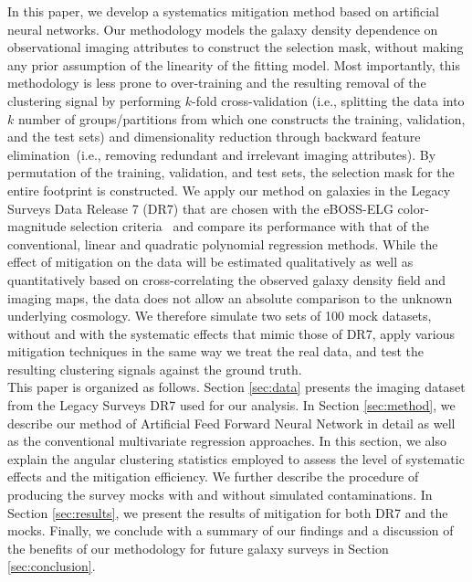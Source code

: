 In this paper, we develop a systematics mitigation method based on artificial neural networks. Our methodology models the galaxy density dependence on observational imaging attributes to construct the selection mask, without making any prior assumption of the linearity of the fitting model. Most importantly, this methodology is less prone to over-training and the resulting removal of the clustering signal by performing $k$-fold cross-validation (i.e., splitting the data into $k$ number of groups/partitions from which one constructs the training, validation, and the test sets) and dimensionality reduction through backward feature elimination~(i.e., removing redundant and irrelevant imaging attributes)\citep[see e.g.,][]{devijver1982pattern, john1994irrelevant, koller1996toward, kohavi1997wrappers, ramaswamy2001multiclass, guyon2003introduction}.  By permutation of the training, validation, and test sets, the selection mask for the entire footprint is constructed.  We apply our method on galaxies in the Legacy Surveys Data Release 7 (DR7) \citep{dey2018overview} that are chosen with the eBOSS-ELG color-magnitude selection criteria~\citep{Raichoor2017MNRAS.471.3955R} and compare its performance with that of the conventional, linear and quadratic polynomial regression methods. While the effect of mitigation on the data will be estimated qualitatively as well as quantitatively based on cross-correlating the observed galaxy density field and imaging maps, the data does not allow an absolute comparison to the unknown underlying cosmology. We therefore simulate two sets of 100 mock datasets, without and with the systematic effects that mimic those of DR7, apply various mitigation techniques in the same way we treat the real data, and test the resulting clustering signals against the ground truth.\\


This paper is organized as follows. Section \ref{sec:data} presents the imaging dataset from the Legacy Surveys DR7 used for our analysis. In Section \ref{sec:method}, we describe our method of Artificial Feed Forward Neural Network in detail as well as the conventional multivariate regression approaches. In this section, we also explain the angular clustering statistics employed to assess the level of systematic effects and the mitigation efficiency. We further describe the procedure of producing the survey mocks with and without simulated contaminations. In Section \ref{sec:results}, we present the results of mitigation for both DR7 and the mocks. Finally, we conclude with a summary of our findings and a discussion of the benefits of our methodology for future galaxy surveys in Section \ref{sec:conclusion}.\\
